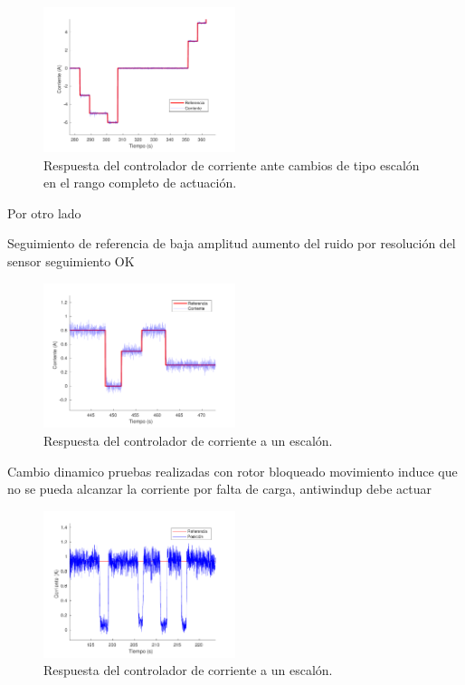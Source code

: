 \begin{figure}[ht]
  \centering
  \includegraphics[width=0.5\textwidth]{img/cap5/corriente_cambio_referencia_alto.pdf}
  \caption{Respuesta del controlador de corriente ante cambios de tipo escalón en el rango completo de actuación.}
  \label{cap5_corriente_cambio_referencia_alto}
\end{figure}

Por otro lado

Seguimiento de referencia de baja amplitud
aumento del ruido por resolución del sensor
seguimiento OK

\begin{figure}[ht]
  \centering
  \includegraphics[width=0.5\textwidth]{img/cap5/corriente_cambio_referencia_bajo.pdf}
  \caption{Respuesta del controlador de corriente a un escalón.}
  \label{cap5_corriente_cambio_referencia_bajo}
\end{figure}




Cambio dinamico
pruebas realizadas con rotor bloqueado
movimiento induce que no se pueda alcanzar la corriente por falta de carga, antiwindup debe actuar

\begin{figure}[ht]
  \centering
  \includegraphics[width=0.5\textwidth]{img/cap5/cambio_dinamico_corriente.pdf}
  \caption{Respuesta del controlador de corriente a un escalón.}
  \label{cap5_cambio_dinamico_corriente}
\end{figure}


